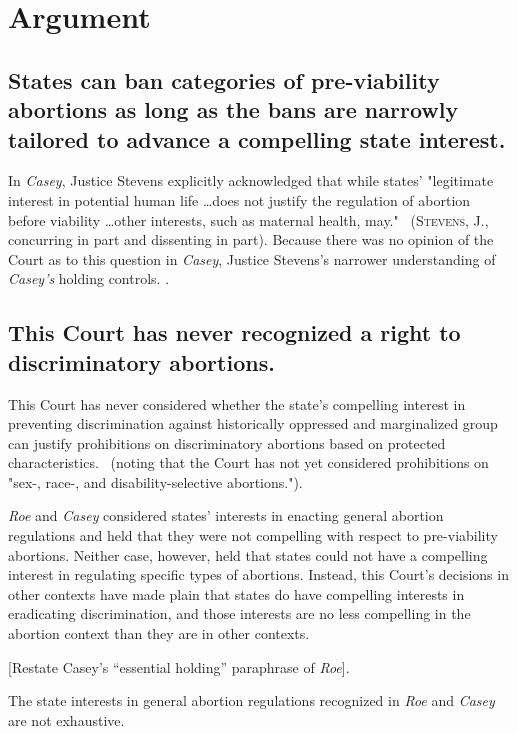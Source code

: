 \documentclass[12pt,\documentclassflag]{SCOTUS_Brief}
\begin{document}
\section{Argument}

\subsection{States can ban categories of pre-viability abortions as long as the bans are narrowly tailored to advance a compelling state interest.}

In \textit{Casey}, Justice Stevens explicitly acknowledged that while states' "legitimate interest in potential human life \ldots  does not justify the regulation of abortion before viability \ldots  other interests, such as maternal health, may." ~(\textsc{Stevens}, J., concurring in part and dissenting in part). Because there was no opinion of the Court as to this question in \textit{Casey}, Justice Stevens's narrower understanding of \textit{Casey's} holding controls. \Seegenerally \cite{Marks}.

\subsection{This Court has never recognized a right to discriminatory abortions.}

This Court has never considered whether the state's compelling interest in preventing discrimination against historically oppressed and marginalized group can justify prohibitions on discriminatory abortions based on protected characteristics. ~(noting that the Court has not yet considered prohibitions on "sex-, race-, and disability-selective abortions.").

\textit{Roe} \cite[!]{Roe} and \textit{Casey} \cite[!]{Casey} considered states’ interests in enacting general abortion regulations and held that they were not compelling with respect to pre-viability abortions. Neither case, however, held that states could not have a compelling interest in regulating specific types of abortions. Instead, this Court’s decisions in other contexts have made plain that states do have compelling interests in eradicating discrimination, and those interests are no less compelling in the abortion context than they are in other contexts.

[Restate Casey’s “essential holding” paraphrase of \textit{Roe}].

The state interests in general abortion regulations recognized in \textit{Roe} and \textit{Casey} are not exhaustive.
\end{document}

